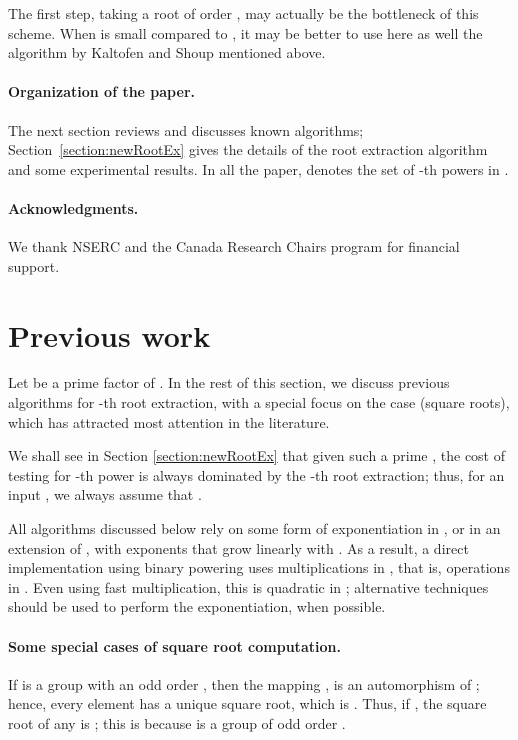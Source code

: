 \documentclass[12pt]{article}
\theoremstyle{plain}
\theoremstyle{definition}
\newcommand{\refsection}[1]{Section \ref{#1}}
\newcounter{algorithm}
\begin{document}
The first step, taking a root of order , may actually be the
bottleneck of this scheme. When  is small compared to , it may
be better to use here as well the algorithm by Kaltofen and Shoup
mentioned above.



\paragraph{Organization of the paper.} 
The next section reviews and discusses known algorithms;
Section~\ref{section:newRootEx} gives the details of the root
extraction algorithm and some experimental results. In all the paper,
 denotes the set of -th powers in .

\paragraph{Acknowledgments.} We thank NSERC and the Canada Research
Chairs program for financial support.



\section{Previous work}

Let  be a prime factor of .  In the rest of this section, we discuss
previous algorithms for -th root extraction, with a special focus
on the case  (square roots), which has attracted most attention
in the literature.

We shall see in \refsection{section:newRootEx} that given such a prime
, the cost of testing for -th power is always dominated by the
-th root extraction; thus, for an input , we always
assume that .

All algorithms discussed below rely on some form of exponentiation in
, or in an extension of , with exponents that grow
linearly with . As a result, a direct implementation using binary
powering uses  multiplications in , that is,
 operations in . Even using fast
multiplication, this is quadratic in ; alternative techniques
should be used to perform the exponentiation, when possible.

\paragraph{Some special cases of square root computation.}
If  is a group with an odd order , then the mapping ,  is an automorphism of ; hence, every
element  has a unique square root, which is . Thus, if , the square root of any  is ; this is because  is a
group of odd order .
\end{document}
